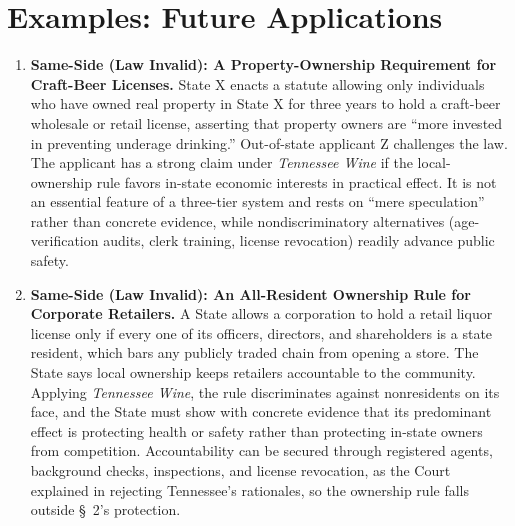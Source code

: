 \documentclass[12pt]{article}
\begin{document}
\section{Examples: Future Applications}
\begin{enumerate}

\item \textbf{Same-Side (Law Invalid): A Property-Ownership Requirement for Craft-Beer Licenses.} State X enacts a statute allowing only individuals who have owned real property in State X for three years to hold a craft-beer wholesale or retail license, asserting that property owners are ``more invested in preventing underage drinking.'' Out-of-state applicant Z challenges the law. The applicant has a strong claim under \textit{Tennessee Wine} if the local-ownership rule favors in-state economic interests in practical effect. It is not an essential feature of a three-tier system and rests on ``mere speculation'' rather than concrete evidence, while nondiscriminatory alternatives (age-verification audits, clerk training, license revocation) readily advance public safety.

\item \textbf{Same-Side (Law Invalid): An All-Resident Ownership Rule for Corporate Retailers.} A State allows a corporation to hold a retail liquor license only if every one of its officers, directors, and shareholders is a state resident, which bars any publicly traded chain from opening a store. The State says local ownership keeps retailers accountable to the community. Applying \textit{Tennessee Wine}, the rule discriminates against nonresidents on its face, and the State must show with concrete evidence that its predominant effect is protecting health or safety rather than protecting in-state owners from competition. Accountability can be secured through registered agents, background checks, inspections, and license revocation, as the Court explained in rejecting Tennessee's rationales, so the ownership rule falls outside \S~2's protection.


\end{enumerate}
\end{document}
